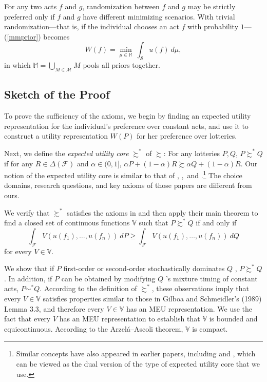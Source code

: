 \documentclass[12pt, notitlepage]{article}
\begin{document}
For any two acts $f$ and $g$, randomization between $f$ and $g$ may be
strictly preferred only if $f$ and $g$ have different minimizing scenarios.
With trivial randomization---that is, if the individual chooses an act $f$
with probability $1$---(\ref{mmprior}) becomes%
\begin{equation*}
W(f)=\min_{\mu \in \mathbb{M}}~\int_{\mathcal{S}}u(f)~d\mu ,
\end{equation*}%
in which $\mathbb{M}=\bigcup_{M\in \mathcal{M}}M$ pools all priors together.

\subsection{Sketch of the Proof}

\label{proof}To prove the sufficiency of the axioms, we begin by finding an
expected utility representation for the individual's preference over
constant acts, and use it to construct a utility representation $W(P)$ for
her preference over lotteries.

Next, we define the \textit{expected utility core} $\succsim ^{\ast }$ of $%
\succsim $: For any lotteries $P,Q$, $P\succsim ^{\ast }Q$ if for any $R\in
\Delta (\mathcal{F})$ and $\alpha \in (0,1]$, $\alpha P+(1-\alpha )R\succsim
\alpha Q+(1-\alpha )R$. Our notion of the expected utility core is similar
to that of \cite{Cerreia-Vioglio09}, \cite%
{Cerreia-VioglioDillenbergerOrtoleva15},\ and \cite%
{Cerreia-VioglioMaccheroniMarinacci17}.\footnote{%
Similar concepts have also appeared in earlier papers, including \cite%
{Nehring01} and \cite{GhirardatoMaccheroniMarinacci04}, which can be viewed
as the dual version of the type of expected utility core that we use.} The
choice domains, research questions, and key axioms of those papers are
different from ours.

We verify that $\succsim ^{\ast }$ satisfies the axioms in \cite%
{DubraMaccheroniOk04} and then apply their main theorem to find a closed set
of continuous functions $\mathbb{V}$ such that $P\succsim ^{\ast }Q$ if and
only if%
\begin{equation*}
\int_{\mathcal{F}}V(u(f_{1}),\dots ,u(f_{n}))~dP\geq \int_{\mathcal{F}%
}V(u(f_{1}),\dots ,u(f_{n}))~dQ
\end{equation*}%
for every $V\in \mathbb{V}$.

We show that if $P$ first-order or second-order stochastically dominates $Q$%
, $P\succsim ^{\ast }Q$. In addition, if $P$ can be obtained by modifying $Q$%
's mixture timing of constant acts, $P\sim ^{\ast }Q$. According to the
definition of $\succsim ^{\ast }$, these observations imply that every $V\in 
\mathbb{V}$ satisfies properties similar to those in Gilboa and Schmeidler's
(1989) Lemma 3.3, and therefore every $V\in \mathbb{V}$ has an MEU
representation. We use the fact that every $V$ has an MEU representation to
establish that $\mathbb{V}$ is bounded and equicontinuous. According to the
Arzel\'{a}--Ascoli theorem, $\mathbb{V}$ is compact.
\end{document}

